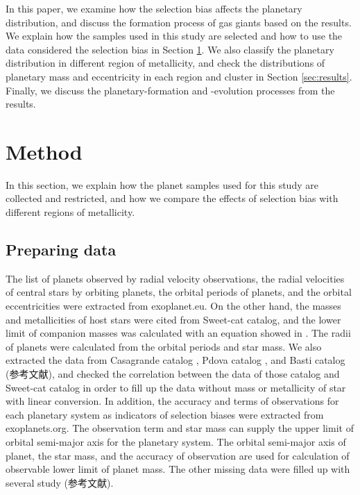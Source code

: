 \documentclass[twocolumn, dvipdfmx]{aastex62}
\begin{document}
\begin{CJK*}{UTF8}{min}
In this paper, we examine how the selection bias affects the planetary distribution, and discuss the formation process of gas giants based on the results. We explain how the samples used in this study are selected and how to use the data considered the selection bias in Section \ref{sec:method}. We also classify the planetary distribution in different region of metallicity, and check the distributions of planetary mass and eccentricity in each region and cluster in Section \ref{sec:results}. Finally, we discuss the planetary-formation and -evolution processes from the results.


\section{Method} \label{sec:method}

In this section, we explain how the planet samples used for this study are collected and restricted, and how we compare the effects of selection bias with different regions of metallicity.


\subsection{Preparing data} \label{subsec:prepare}

The list of planets observed by radial velocity observations, the radial velocities of central stars by orbiting planets, the orbital periods of planets, and the orbital eccentricities were extracted from exoplanet.eu. On the other hand, the masses and metallicities of host stars were cited from Sweet-cat catalog, and the lower limit of companion masses was calculated with an equation showed in \cite{2008ApJ...677.1324T}. The radii of planets were calculated from the orbital periods and star mass. We also extracted the data from Casagrande catalog \citep{2011A&A...530A.138C}, Pdova catalog \citep{2011MNRAS.416..727C}, and Basti catalog (参考文献), and checked the correlation between the data of those catalog and Sweet-cat catalog in order to fill up the data without mass or metallicity of star with linear conversion. In addition, the accuracy and terms of observations for each planetary system as indicators of selection biases were extracted from exoplanets.org. The observation term and star mass can supply the upper limit of orbital semi-major axis for the planetary system. The orbital semi-major axis of planet, the star mass, and the accuracy of observation are used for calculation of observable lower limit of planet mass. The other missing data were filled up with several study (参考文献).


\end{CJK*}
\end{document}
